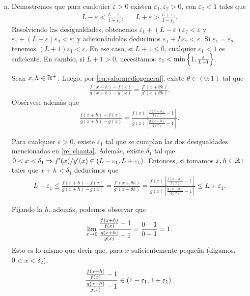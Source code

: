 {\begin{enumerate}[a)]
		\item

			Demostremos que para cualquier $\varepsilon>0$ existen $\varepsilon_1,\varepsilon_2>0$, con $\varepsilon_2<1$ tales que
			\begin{align} \label{rel:chanta}
				L-\varepsilon < \frac{L-\varepsilon_1}{1+\varepsilon_2} , && L+\varepsilon > \frac{L+\varepsilon_1}{1-\varepsilon_2} .
			\end{align}
			Resolviendo las desigualdades, obtenemos $\varepsilon_1+(L-\varepsilon)\varepsilon_2 < \varepsilon$ y $\varepsilon_1+(L+\varepsilon)\varepsilon_2 < \varepsilon$; y adicionándolas deducimos $\varepsilon_1+L\varepsilon_2 < \varepsilon$.
			Si $\varepsilon_1=\varepsilon_2$ tenemos $(L+1)\varepsilon_1<\varepsilon$.
			En ese caso, si $L+1\leq 0$, cualquier $\varepsilon_1<1$ es suficiente. En cambio, si $L+1>0$, necesitamos $\varepsilon_1<\min\left\{1,\frac{\varepsilon}{L+1}\right\}$.

			Sean $x,h\in\mathbb{R}^+$. Luego, por \eqref{eq:valormediogeneral}, existe $\theta\in(0;1)$ tal que 
			\begin{align*}
				\frac{f(x+h)-f(x)}{g(x+h)-g(x)} = \frac{f'(x+\theta h)}{g'(x+\theta h)} .
			\end{align*}
			Obsérvese además que 
			\begin{align*}
				\frac{f(x+h)-f(x)}{g(x+h)-g(x)} = \frac{f(x)\left[\frac{f(x+h)}{f(x)}-1\right]}{g(x)\left[\frac{g(x+h)}{g(x)}-1\right]} .
			\end{align*}

			Para cualquier $\varepsilon>0$, existe $\varepsilon_1$ tal que se cumplan las dos desigualdades mencionadas en \eqref{rel:chanta}.
			Además, existe $\delta_1$ tal que $0<x<\delta_1\Rightarrow f'(x)/g'(x)\in\left(L-\varepsilon_1,L+\varepsilon_1\right)$.
			Entonces, si tomamos $x,h\in\mathbb{R}+$ tales que $x+h<\delta_1$ deducimos que
			\begin{align} \label{rel:cotaL}
				L - \varepsilon_1 \leq
				\frac{f(x+h)-f(x)}{g(x+h)-g(x)} = \frac{f'(x+\theta h)}{g'(x+\theta h)} = \frac{f(x)\left[\frac{f(x+h)}{f(x)}-1\right]}{g(x)\left[\frac{g(x+h)}{g(x)}-1\right]}
				\leq L + \varepsilon_1 .
			\end{align}

			Fijando la $h$, además, podemos observar que
			\begin{align*}
				\limite{x}[0]{
					\frac
						{\frac{f(x+h)}{f(x)}-1}
						{\frac{g(x+h)}{g(x)}-1}
					}
				= \frac{0-1}{0-1} = 1 .
			\end{align*}
			Esto es lo mismo que decir que, para $x$ suficientemente pequeña (digamos, $0<x<\delta_2$), 
			\begin{align} \label{rel:cota1}
				\frac
					{\frac{f(x+h)}{f(x)}-1}
					{\frac{g(x+h)}{g(x)}-1}
				\in\left(1-\varepsilon_1,1+\varepsilon_1\right) .
			\end{align}


\end{enumerate}}
